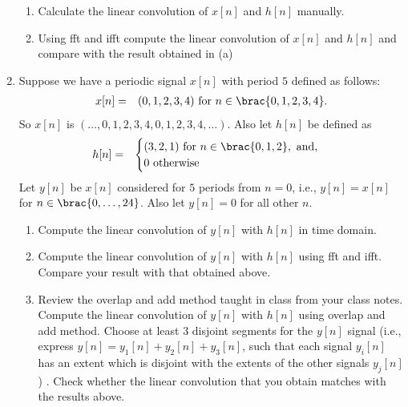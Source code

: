 \begin{enumerate}
  \begin{enumerate}
  \item Calculate the linear convolution of $x[n]$ and $h[n]$ manually.
  \item Using fft and ifft compute the linear convolution of $x[n]$ and $h[n]$ and compare with the result obtained in (a)
  \end{enumerate}
\item Suppose we have a periodic signal $x[n]$ with period $5$ defined as follows:
  \begin{eqnarray*}
    x[n] & = & (0,1,2,3,4) \text{ for } n \in \brac{0,1,2,3,4}.
  \end{eqnarray*}
  So $x[n]$ is $(\dots, 0, 1, 2, 3, 4, 0, 1, 2, 3, 4, \dots)$.
  Also let $h[n]$ be defined as
  \begin{eqnarray*}
    h[n] & = &
    \begin{cases}
      (3,2,1) \text{ for } n \in \brac{0,1,2}, \text{ and}, \\
      0 \text{ otherwise }
    \end{cases}
  \end{eqnarray*}
  Let $y[n]$ be $x[n]$ considered for $5$ periods from $n = 0$, i.e., $y[n] = x[n]$ for $n \in \brac{0, \dots, 24}$.
  Also let $y[n] = 0$ for all other $n$.
  \begin{enumerate}
  \item Compute the linear convolution of $y[n]$ with $h[n]$ in time domain.
  \item Compute the linear convolution of $y[n]$ with $h[n]$ using fft and ifft. Compare your result with that obtained above.
  \item Review the overlap and add method taught in class from your class notes. Compute the linear convolution of $y[n]$ with $h[n]$ using overlap and add method. Choose at least 3 disjoint segments for the $y[n]$ signal (i.e., express $y[n] = y_{1}[n] + y_{2}[n] + y_{3}[n]$, such that each signal $y_{i}[n]$ has an extent which is disjoint with the extents of the other signals $y_{j}[n]$) . Check whether the linear convolution that you obtain matches with the results above.
  \end{enumerate}

\end{enumerate}


